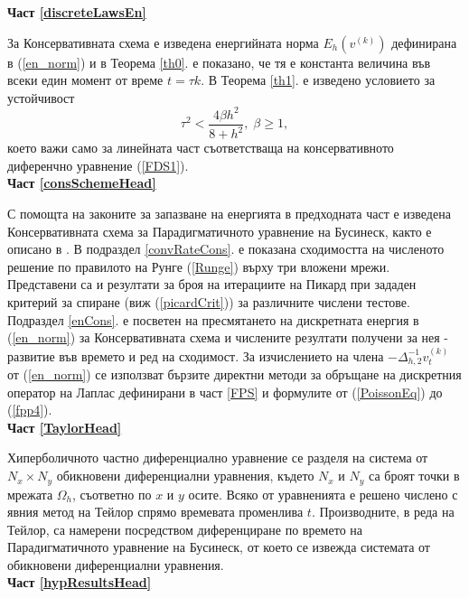 \documentclass[a5paper]{article}
\newcommand{\be}{\begin{equation}}
\newcommand{\ee}{\end{equation}}
\newcommand{\rf}[1]{(\ref{#1})}
\theoremstyle{remark}
\begin{document}
\begin{normalsize}
\textbf{Част \ref{discreteLawsEn}}

За Консервативната схема е изведена енергийната норма $E_h(v^{(k)})$ дефинирана в \rf{en_norm} и в Теорема \ref{th0}. е показано, че тя е константа величина във всеки един момент от време $t=\tau k$. В Теорема \ref{th1}. е изведено условието за устойчивост
\be
\tau^2 < \frac{ 4 \beta h^2 } { 8 + h^2}, \; \beta \ge 1,
\ee 
което важи само за линейната част съответстваща на консервативното диференчно уравнение \rf{FDS1}.\\

\textbf{Част \ref{consSchemeHead}}

С помощта на законите за запазване на енергията в предходната част е изведена Консервативната схема за Парадигматичното уравнение на Бусинеск, както е описано в \cite{ref25}. В подраздел \ref{convRateCons}. е показана сходимостта на численото решение по правилото на Рунге \rf{Runge} върху три вложени мрежи. Представени са и резултати за броя на итерациите на Пикард при зададен критерий за спиране (виж \rf{picardCrit}) за различните числени тестове. Подраздел \ref{enCons}. е посветен на пресмятането на дискретната енергия в \rf{en_norm} за Консервативната схема и числените резултати получени за нея - развитие във времето и ред на сходимост. За изчислението на члена $-\Delta_{h,2}^{-1}v_{t}^{(k)}$ от \rf{en_norm} се използват бързите директни методи за обръщане на дискретния оператор на Лаплас дефинирани в част \ref{FPS} и формулите от \rf{PoissonEq} до \rf{fpp4}.\\

\textbf{Част \ref{TaylorHead}}

Хиперболичното частно диференциално уравнение се разделя на система от $N_x \times N_y$ обикновени диференциални уравнения, където $N_x$ и $N_y$ са броят точки в мрежата $\Omega_h$, съответно по $x$ и $y$ осите. Всяко от уравненията е решено числено с явния метод на Тейлор спрямо времевата променлива $t$. Производните, в реда на Тейлор, са намерени посредством диференциране по времето на Парадигматичното уравнение на Бусинеск, от което се извежда системата от обикновени диференциални уравнения.\\

\textbf{Част \ref{hypResultsHead}}


\end{normalsize}
\end{document}
